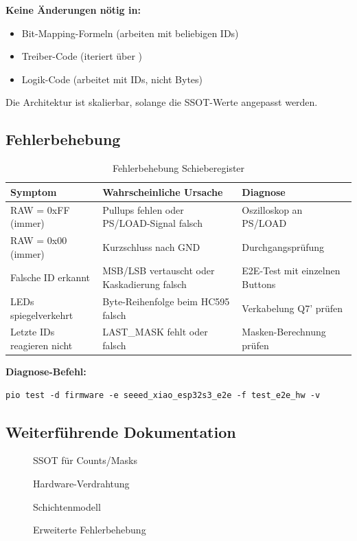 \textbf{Keine Änderungen nötig in:}
\begin{itemize}
\item Bit-Mapping-Formeln (arbeiten mit beliebigen IDs)
\item Treiber-Code (iteriert über )
\item Logik-Code (arbeitet mit IDs, nicht Bytes)
\end{itemize}

\begin{tipbox}[Konsequenz]
Die Architektur ist skalierbar, solange die SSOT-Werte angepasst werden.
\end{tipbox}

\subsection{Fehlerbehebung}

\begin{table}[htbp]
\centering
\begin{tabularx}{\textwidth}{@{}lXl@{}}
\toprule
\textbf{Symptom} & \textbf{Wahrscheinliche Ursache} & \textbf{Diagnose} \\
\midrule
RAW = 0xFF (immer) & Pullups fehlen oder PS/LOAD-Signal falsch & Oszilloskop an PS/LOAD \\
RAW = 0x00 (immer) & Kurzschluss nach GND & Durchgangsprüfung \\
Falsche ID erkannt & MSB/LSB vertauscht oder Kaskadierung falsch & E2E-Test mit einzelnen Buttons \\
LEDs spiegelverkehrt & Byte-Reihenfolge beim HC595 falsch & Verkabelung Q7' prüfen \\
Letzte IDs reagieren nicht & LAST\_MASK fehlt oder falsch & Masken-Berechnung prüfen \\
\bottomrule
\end{tabularx}
\caption{Fehlerbehebung Schieberegister}
\label{tab:fehlersuche}
\end{table}

\textbf{Diagnose-Befehl:}

\begin{lstlisting}[style=shell]
pio test -d firmware -e seeed_xiao_esp32s3_e2e -f test_e2e_hw -v
\end{lstlisting}

\subsection{Weiterführende Dokumentation}

\begin{description}
\item[] SSOT für Counts/Masks
\item[] Hardware-Verdrahtung
\item[] Schichtenmodell
\item[] Erweiterte Fehlerbehebung
\end{description}
